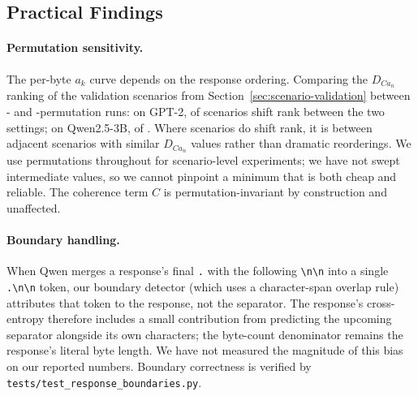 \subsection{Practical Findings}\label{sec:practical-findings}

\paragraph{Permutation sensitivity.} The per-byte $a_k$ curve depends on the response ordering.
Comparing the $D_{Ca_n}$ ranking of the \permSensNumScenarios{} validation scenarios from Section~\ref{sec:scenario-validation} between \permSensLowPerm{}- and \permSensHighPerm{}-permutation runs: on GPT-2, \permSensGPTMisranked{} of \permSensNumScenarios{} scenarios shift rank between the two settings; on Qwen2.5-3B, \permSensQwenMisranked{} of \permSensNumScenarios{}.
Where scenarios do shift rank, it is between adjacent scenarios with similar $D_{Ca_n}$ values rather than dramatic reorderings.
We use \permSensHighPerm{} permutations throughout for scenario-level experiments; we have not swept intermediate values, so we cannot pinpoint a minimum that is both cheap and reliable.
The coherence term $C$ is permutation-invariant by construction and unaffected.

\paragraph{Boundary handling.} When Qwen merges a response's final \texttt{.} with the following \texttt{\textbackslash n\textbackslash n} into a single \texttt{.\textbackslash n\textbackslash n} token, our boundary detector (which uses a character-span overlap rule) attributes that token to the response, not the separator.
The response's cross-entropy therefore includes a small contribution from predicting the upcoming separator alongside its own characters; the byte-count denominator remains the response's literal byte length.
We have not measured the magnitude of this bias on our reported numbers.
Boundary correctness is verified by \texttt{tests/test\_response\_boundaries.py}.

